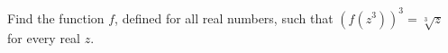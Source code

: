 Find the function $f$, defined for all real numbers, such that $\left(f\left(z^3\right)\right)^3=\sqrt[3]{z}$ for every real $z$.
